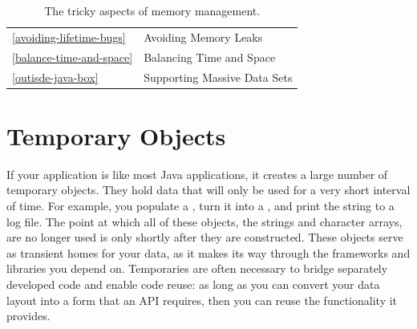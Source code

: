 
\begin{table}
\centering
	\begin{tabular}{ll} \toprule
    	\autoref{avoiding-lifetime-bugs} & {Avoiding Memory Leaks} \\
    	\autoref{balance-time-and-space} & {Balancing Time and Space} \\
    	\autoref{outisde-java-box} & {Supporting Massive Data Sets}  	\\
        \bottomrule
    \end{tabular}
	\caption{The tricky aspects of memory management.}
	\label{tab:tricky-memory-management}
\end{table}

\section{Temporary Objects}
\label{temporary-lifetime}

If your application is like most Java applications, it creates a large number of
temporary objects. They hold data that will only be used for a very short
interval of time. For example, you populate a , turn it into
a , and print the string to a log file. The point at which all of
these objects, the strings and character arrays, are no longer used is only
shortly after they are constructed. These objects serve as transient homes for
your data, as it makes its way through the frameworks and libraries you depend
on. Temporaries are often necessary to bridge separately developed code and
enable code reuse: as long as you can convert your data layout into a form that
an API requires, then you can reuse the functionality it provides.

